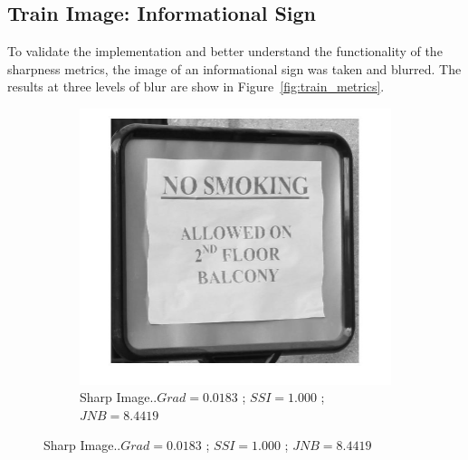 \subsection{Train Image: Informational Sign}
To validate the implementation and better understand the functionality of the sharpness metrics, the image of an informational sign was taken and blurred. The results at three levels of blur are show in Figure~\ref{fig:train_metrics}.

\begin{figure}[h!]
        \centering
        \begin{subfigure}[b]{0.35\textwidth}
                \centering
                \includegraphics[width=\textwidth]{true.jpg}
                \caption{Sharp Image..\newline $Grad=0.0183$ ; $SSI=1.000$ ; $JNB=8.4419$}
               

\end{subfigure}
\end{figure}
